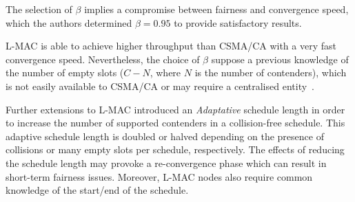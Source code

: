The selection of $\beta$ implies a compromise between fairness and convergence speed, which the authors determined $\beta=0.95$ to provide satisfactory results.

L-MAC is able to achieve higher throughput than CSMA/CA with a very fast convergence speed. Nevertheless, the choice of $\beta$ suppose a previous knowledge of the number of empty slots ($C-N$, where $N$ is the number of contenders), which is not easily available to CSMA/CA or may require a centralised entity~\cite{barcelo2011tcf}.

Further extensions to L-MAC introduced an \emph{Adaptative} schedule length in order to increase the number of supported contenders in a collision-free schedule. This adaptive schedule length is doubled or halved depending on the presence of collisions or many empty slots per schedule, respectively. The effects of reducing the schedule length may provoke a re-convergence phase which can result in short-term fairness issues. Moreover, L-MAC nodes also require common knowledge of the start/end of the schedule.